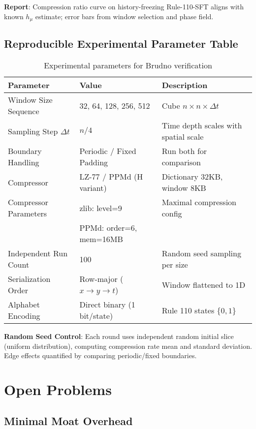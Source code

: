 \documentclass[12pt]{article}
\theoremstyle{plain}
\theoremstyle{definition}
\begin{document}
\textbf{Report}: Compression ratio curve on history-freezing Rule-110-SFT aligns with known $h_\mu$ estimate; error bars from window selection and phase field.

\subsection{Reproducible Experimental Parameter Table}

\begin{table}[h]
\centering
\caption{Experimental parameters for Brudno verification}
\small
\begin{tabular}{@{}lll@{}}
\toprule
Parameter & Value & Description \\
\midrule
Window Size Sequence & 32, 64, 128, 256, 512 & Cube $n \times n \times \Delta t$ \\
Sampling Step $\Delta t$ & $n/4$ & Time depth scales with spatial scale \\
Boundary Handling & Periodic / Fixed Padding & Run both for comparison \\
Compressor & LZ-77 / PPMd (H variant) & Dictionary 32KB, window 8KB \\
Compressor Parameters & zlib: level=9 & Maximal compression config \\
& PPMd: order=6, mem=16MB & \\
Independent Run Count & 100 & Random seed sampling per size \\
Serialization Order & Row-major ($x \to y \to t$) & Window flattened to 1D \\
Alphabet Encoding & Direct binary (1 bit/state) & Rule 110 states $\{0,1\}$ \\
\bottomrule
\end{tabular}
\end{table}

\textbf{Random Seed Control}: Each round uses independent random initial slice (uniform distribution), computing compression rate mean and standard deviation. Edge effects quantified by comparing periodic/fixed boundaries.

\section{Open Problems}

\subsection{Minimal Moat Overhead}
\end{document}
